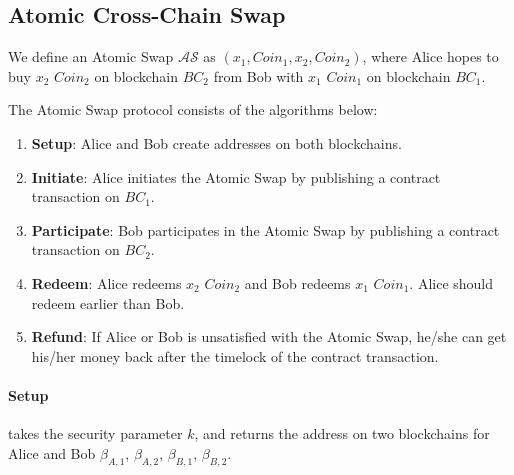 

\subsection{Atomic Cross-Chain Swap}

\begin{definition}
We define an Atomic Swap $\mathcal{AS}$ as $(x_1, Coin_1, x_2, Coin_2)$, where
Alice hopes to buy $x_2$ $Coin_2$ on blockchain $BC_2$ from Bob with $x_1$ $Coin_1$ on blockchain $BC_1$.
\end{definition}

The Atomic Swap protocol consists of the algorithms below:

\begin{enumerate}
    \item \textbf{Setup}: Alice and Bob create addresses on both blockchains.
    \item \textbf{Initiate}: Alice initiates the Atomic Swap by publishing a contract transaction on $BC_1$.
    \item \textbf{Participate}: Bob participates in the Atomic Swap by publishing a contract transaction on $BC_2$.
    \item \textbf{Redeem}: Alice redeems $x_2$ $Coin_2$ and Bob redeems $x_1$ $Coin_1$. Alice should redeem earlier than Bob.
    \item \textbf{Refund}: If Alice or Bob is unsatisfied with the Atomic Swap, he/she can get his/her money back after the timelock of the contract transaction.
\end{enumerate}

\paragraph{Setup}
takes the security parameter $k$,
and returns the address on two blockchains for Alice and Bob $\beta_{A, 1}$, $\beta_{A, 2}$, $\beta_{B, 1}$, $\beta_{B, 2}$.

